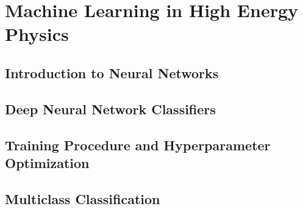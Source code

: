 \chapter{Machine Learning in High Energy Physics}
\label{chap:ml}

\section{Introduction to Neural Networks}
\section{Deep Neural Network Classifiers}
\section{Training Procedure and Hyperparameter Optimization}
\section{Multiclass Classification}

